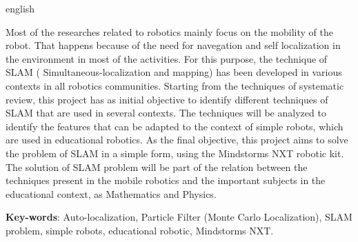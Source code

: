 \begin{resumo}[Abstract]
 \begin{otherlanguage*}{english}

   Most of the researches related to robotics mainly focus on the mobility of the robot. That happens because of the need for navegation and self localization in the environment in most of the activities. For this purpose, the technique of SLAM ( Simultaneous-localization and mapping) has been developed in various contexts in all robotics communities. Starting from the techniques of systematic review, this project has as initial objective to identify different techniques of SLAM that are used in several contexts. The techniques will be analyzed to identify  the features that can be adapted to the context of simple robots, which are used in educational robotics. As the final objective, this project aims to solve the problem of SLAM in a simple form, using the Mindstorms NXT robotic kit. The solution of SLAM problem will be part of the relation between the techniques present in the mobile robotics and the important subjects in the educational context, as Mathematics and Physics.

   \vspace{\onelineskip}

   \noindent
   \textbf{Key-words}: Auto-localization, Particle Filter (Monte Carlo Localization), SLAM problem, simple robots, educational robotic, Mindstorms NXT.
 \end{otherlanguage*}
\end{resumo}

